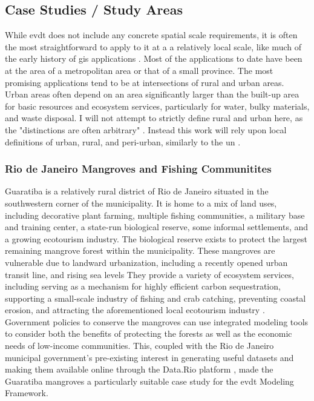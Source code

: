 \documentclass[notitlepage]{article}
\begin{document}
\subsection{Case Studies / Study Areas} \label{sec:cases}

While \ac{evdt} does not include any concrete spatial scale requirements, it is often the most straightforward to apply to it at a a relatively local scale, like much of the early history of \ac{gis} applications \cite{tullochInstitutionalGeographicInformation2007}. Most of the applications to date have been at the area of a metropolitan area or that of a small province. The most promising applications tend to be at intersections of rural and urban areas. Urban areas often depend on an area significantly larger than the built-up area for basic resources and ecosystem services, particularly for water, bulky materials, and waste disposal. I will not attempt to strictly define rural and urban here, as the "distinctions are often arbitrary" \cite{tacoliRuralurbanInteractionsGuide1998}. Instead this work will rely upon local definitions of urban, rural, and peri-urban, similarly to the \ac{un} \cite{sachsAgeSustainableDevelopment2015}. 

\subsubsection{Rio de Janeiro Mangroves and Fishing Communitites}

Guaratiba is a relatively rural district of Rio de Janeiro situated in the southwestern corner of the municipality. It is home to a mix of land uses, including decorative plant farming, multiple fishing communities, a military base and training center, a state-run biological reserve, some informal settlements, and a growing ecotourism industry. The biological reserve exists to protect the largest remaining mangrove forest within the municipality. These mangroves are vulnerable due to landward urbanization, including a recently opened urban transit line, and rising sea levels \cite{goldbergEcoMapDecisionsupportTool2018} They provide a variety of ecosystem services, including serving as a mechanism for highly efficient carbon sequestration, supporting a small-scale industry of fishing and crab catching, preventing coastal erosion, and attracting the aforementioned local ecotourism industry \cite{schwenkResearchEnvironmentalSocioeconomical2008}. Government policies to conserve the mangroves can use integrated modeling tools to consider both the benefits of protecting the forests as well as the economic needs of low-income communities. This, coupled with the Rio de Janeiro municipal government's pre-existing interest in generating useful datasets and making them available online through the Data.Rio platform \cite{matheusOpenGovernmentData2014}, made the Guaratiba mangroves a particularly suitable case study for the \ac{evdt} Modeling Framework.
\end{document}
